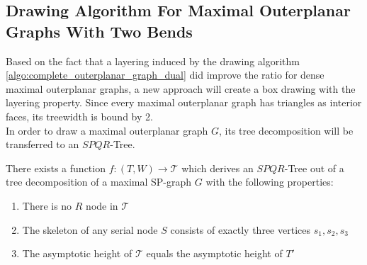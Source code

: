 \subsection{Drawing Algorithm For Maximal Outerplanar Graphs With Two Bends}

Based on the fact that a layering induced by the drawing algorithm \ref{algo:complete_outerplanar_graph_dual} did improve the ratio for dense maximal outerplanar graphs, a new approach will create a box drawing with the layering property. Since every maximal outerplanar graph has triangles as interior faces, its treewidth is bound by 2.\\
In order to draw a maximal outerplanar graph $G$, its tree decomposition will be transferred to an $SPQR$-Tree. 

\begin{lemma}
	There exists a function $f: (T,W) \to \mathcal{T}$ which derives an $SPQR$-Tree out of a tree decomposition of a maximal SP-graph $G$ with the following properties:
	\begin{enumerate}
		\item There is no $R$ node in $\mathcal{T}$
		\item The skeleton of any serial node $S$ consists of exactly three vertices $s_1,s_2,s_3$
		\item The asymptotic height of $\mathcal{T}$ equals the asymptotic height of $T'$		
	\end{enumerate}\label{l:tree_decomp_to_SPQR}
\end{lemma}
